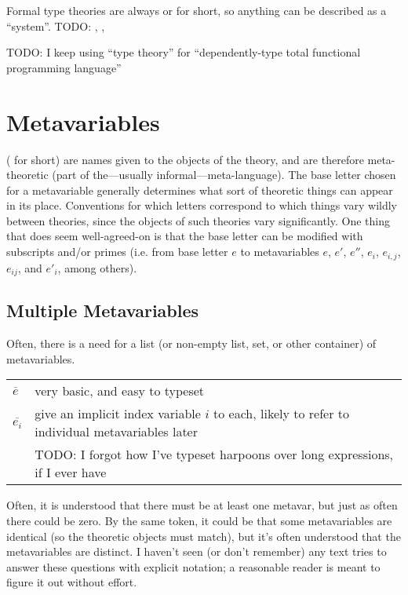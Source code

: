 \documentclass[11pt]{article} %
\theoremstyle{definition}
\theoremstyle{remark}
\begin{document}
Formal type theories are always  or  for short, so anything can be described as a ``system''.
TODO: , , 

TODO: I keep using ``type theory'' for ``dependently-type total functional programming language''

\section{Metavariables}

 ( for short) are names given to the objects of the theory, and are therefore meta-theoretic (part of the---usually informal---meta-language).
The base letter chosen for a metavariable generally determines what sort of theoretic things can appear in its place.
Conventions for which letters correspond to which things vary wildly between theories, since the objects of such theories vary significantly.
One thing that does seem well-agreed-on is that the base letter can be modified with subscripts and/or primes (i.e. from base letter $e$ to metavariables $e$, $e'$, $e''$, $e_i$, $e_{i,j}$, $e_{ij}$, and $e'_i$, among others).

\subsection{Multiple Metavariables}

Often, there is a need for a list (or non-empty list, set, or other container) of metavariables.
\begin{center}
\renewcommand{\arraystretch}{1.2}
\begin{tabular}{lp{10cm}}
$\overline{e}$ & very basic, and easy to typeset \\
$\overline{e_i}$ & give an implicit index variable $i$ to each, likely to refer to individual metavariables later \\
& TODO: I forgot how I've typeset harpoons over long expressions, if I ever have \\
\end{tabular}
\end{center}

Often, it is understood that there must be at least one metavar, but just as often there could be zero.
By the same token, it could be that some metavariables are identical (so the theoretic objects must match), but it's often understood that the metavariables are distinct.
I haven't seen (or don't remember) any text tries to answer these questions with explicit notation; a reasonable reader is meant to figure it out without effort.
\end{document}
